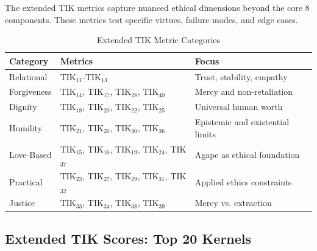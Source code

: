 \documentclass[11pt,a4paper]{article}
\theoremstyle{definition}
\theoremstyle{remark}
\begin{document}
The extended TIK metrics capture nuanced ethical dimensions beyond the core 8 components. These metrics test specific virtues, failure modes, and edge cases.

\begin{table}[H]
\centering
\caption{Extended TIK Metric Categories}
\label{tab:extended-categories}
\begin{tabular}{@{}lp{6cm}l@{}}
\toprule
\textbf{Category} & \textbf{Metrics} & \textbf{Focus} \\
\midrule
Relational & TIK$_{11}$-TIK$_{13}$ & Trust, stability, empathy \\
Forgiveness & TIK$_{14}$, TIK$_{17}$, TIK$_{28}$, TIK$_{40}$ & Mercy and non-retaliation \\
Dignity & TIK$_{18}$, TIK$_{20}$, TIK$_{22}$, TIK$_{25}$ & Universal human worth \\
Humility & TIK$_{21}$, TIK$_{26}$, TIK$_{30}$, TIK$_{36}$ & Epistemic and existential limits \\
Love-Based & TIK$_{15}$, TIK$_{16}$, TIK$_{19}$, TIK$_{24}$, TIK$_{37}$ & Agape as ethical foundation \\
Practical & TIK$_{23}$, TIK$_{27}$, TIK$_{29}$, TIK$_{31}$, TIK$_{32}$ & Applied ethics constraints \\
Justice & TIK$_{33}$, TIK$_{34}$, TIK$_{38}$, TIK$_{39}$ & Mercy vs. extraction \\
\bottomrule
\end{tabular}
\end{table}

\subsection{Extended TIK Scores: Top 20 Kernels}
\end{document}
